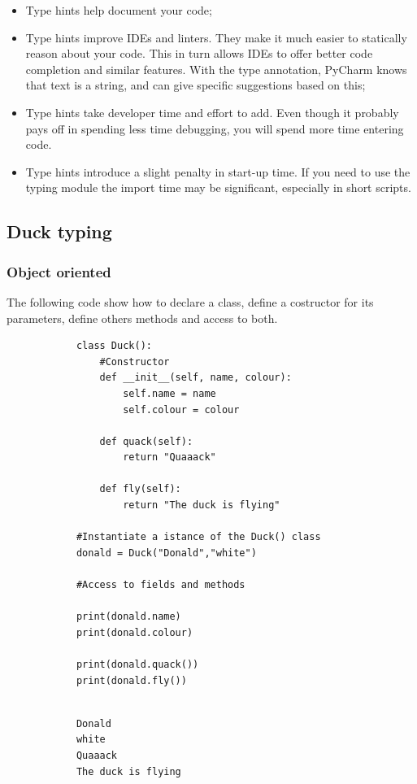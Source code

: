 \documentclass[12pt]{article}
\begin{document}
		\begin{itemize}
			\item Type hints help document your code;
			\item Type hints improve IDEs and linters. They make it much easier to statically reason about your code. This in turn allows IDEs to offer better code completion and similar features. With the type annotation, PyCharm knows that text is a string, and can give specific suggestions based on this;
			\item Type hints take developer time and effort to add. Even though it probably pays off in spending less time debugging, you will spend more time entering code.
			\item Type hints introduce a slight penalty in start-up time. If you need to use the typing module the import time may be significant, especially in short scripts.	
		\end{itemize}
		
		
				
	\subsection{Duck typing}
	
		\subsubsection{Object oriented}
		
		The following code show how to declare a class, define a costructor for its parameters, define others methods and access to both.
		
		\begin{lstlisting}
			class Duck():
				#Constructor 
				def __init__(self, name, colour):
					self.name = name
					self.colour = colour
				
				def quack(self):
					return "Quaaack"
				
				def fly(self):
					return "The duck is flying"
			
			#Instantiate a istance of the Duck() class
			donald = Duck("Donald","white")
			
			#Access to fields and methods
			
			print(donald.name)
			print(donald.colour)
			
			print(donald.quack())
			print(donald.fly())
			
		\end{lstlisting}
		
		\begin{lstlisting}
			Donald
			white
			Quaaack
			The duck is flying
		\end{lstlisting}
		
\end{document}
